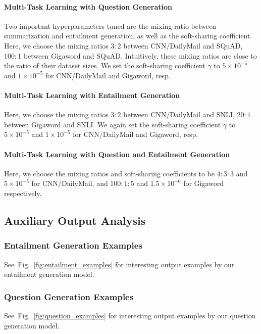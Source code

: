 \documentclass[11pt,a4paper]{article}
\def\figref#1{Fig.~\ref{#1}}
\begin{document}
\paragraph{Multi-Task Learning with Question Generation}
Two important hyperparameters tuned are the mixing ratio between summarization and entailment generation, as well as the soft-sharing coefficient.
Here, we choose the mixing ratios $3{:}2$ between CNN/DailyMail and SQuAD, $100{:}1$ between Gigaword and SQuAD. Intuitively, these mixing ratios are close to the ratio of their dataset sizes. 
We set the soft-sharing coefficient $\gamma$ to $5\times 10^{-5}$ and $1\times 10^{-5}$ for CNN/DailyMail and Gigaword, resp.
 
\paragraph{Multi-Task Learning with Entailment Generation}
Here, we choose the mixing ratios $3{:}2$ between CNN/DailyMail and SNLI, $20{:}1$ between Gigaword and SNLI. We again set the soft-sharing coefficient $\gamma$ to $5\times 10^{-5}$ and $1\times 10^{-5}$ for CNN/DailyMail and Gigaword, resp. 
 

\paragraph{Multi-Task Learning with Question and  Entailment Generation}
 Here, we choose the mixing ratios and soft-sharing coefficients to be $4{:}3{:}3$ and $5\times 10^{-5}$ for CNN/DailyMail, and $100{:}1{:}5$ and $1.5\times 10^{-6}$ for Gigaword respectively. 

\subsection{Auxiliary Output Analysis}
\subsubsection{Entailment Generation Examples}
See~\figref{fig:entailment_examples} for interesting output examples by our entailment generation model.




\subsubsection{Question Generation Examples}
See~\figref{fig:question_examples} for interesting output examples by our question generation model.

 
\end{document}
